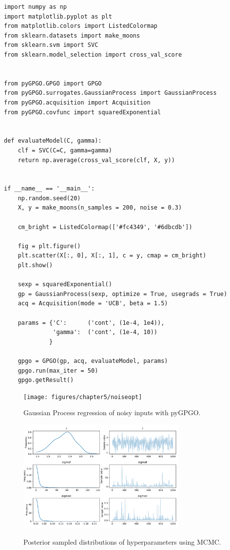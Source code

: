 \documentclass[10pt,a4paper,twoside]{book}
\begin{document}
\begin{verbatim}
import numpy as np
import matplotlib.pyplot as plt
from matplotlib.colors import ListedColormap
from sklearn.datasets import make_moons
from sklearn.svm import SVC
from sklearn.model_selection import cross_val_score


from pyGPGO.GPGO import GPGO
from pyGPGO.surrogates.GaussianProcess import GaussianProcess
from pyGPGO.acquisition import Acquisition
from pyGPGO.covfunc import squaredExponential


def evaluateModel(C, gamma):
    clf = SVC(C=C, gamma=gamma)
    return np.average(cross_val_score(clf, X, y))
    

if __name__ == '__main__':
    np.random.seed(20)
    X, y = make_moons(n_samples = 200, noise = 0.3)

    cm_bright = ListedColormap(['#fc4349', '#6dbcdb'])
    
    fig = plt.figure()
    plt.scatter(X[:, 0], X[:, 1], c = y, cmap = cm_bright)
    plt.show()
    
    sexp = squaredExponential()
    gp = GaussianProcess(sexp, optimize = True, usegrads = True)
    acq = Acquisition(mode = 'UCB', beta = 1.5)

    params = {'C':      ('cont', (1e-4, 1e4)),
              'gamma':  ('cont', (1e-4, 10))
             }

    gpgo = GPGO(gp, acq, evaluateModel, params)
    gpgo.run(max_iter = 50)
    gpgo.getResult()               
\end{verbatim}

\FloatBarrier
\begin{figure}
\centering
\caption{Gaussian Process regression of noisy inputs with pyGPGO.}
\texttt{[image: figures/chapter5/noiseopt]}
\label{fig:noiseopt}
\end{figure}

\begin{figure}
\centering
\caption{Posterior sampled distributions of hyperparameters using MCMC.}
\includegraphics[width=0.75\textwidth]{figures/chapter5/hyperpost}
\label{fig:hyperpost}
\end{figure}
\end{document}
